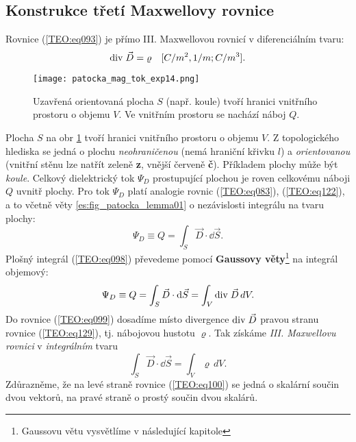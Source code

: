     \subsection{Konstrukce třetí Maxwellovy rovnice}\label{ES:ssec02}
      Rovnice (\ref{TEO:eq093}) je přímo III. Maxwellovou rovnicí v diferenciálním tvaru:
      \begin{equation}\label{TEO:eq129}
        \mathrm{div}\;\vec{D} = \varrho \quad [C/m^2, 1/m; C/m^3]. 
      \end{equation} 
      \begin{figure}[ht!]
        \centering
        \texttt{[image: patocka\_mag\_tok\_exp14.png]}
        \caption{Uzavřená orientovaná plocha \(S\) (např. koule) tvoří hranici vnitřního prostoru o 
                 objemu \(V\). Ve vnitřním prostoru se nachází náboj \(Q\).}
        \label{es:fig_patocka_mag_tok_exp14}
      \end{figure}
      
      Plocha \(S\) na obr \ref{es:fig_patocka_mag_tok_exp14} tvoří hranici vnitřního prostoru o 
      objemu \(V\). Z topologického hlediska se jedná o plochu \emph{neohraničenou} (nemá hraniční 
      křivku \(l\)) a \emph{orientovanou} (vnitřní stěnu lze natřít zeleně \textbf{z}, vnější 
      červeně \textbf{č}). Příkladem plochy může být \emph{koule}. Celkový dielektrický tok 
      \(\Psi_D\) prostupující plochou je roven celkovému náboji \(Q\) uvnitř plochy. Pro tok 
      \(\Psi_D\) platí analogie rovnic (\ref{TEO:eq083}), (\ref{TEO:eq122}), a to 
      včetně věty \ref{es:fig_patocka_lemma01} o nezávislosti integrálu na tvaru plochy:
      \begin{equation}\label{TEO:eq098}
        \Psi_D \equiv Q = \int_S\vec{D}\cdot \dd{\vec{S}}.
      \end{equation} 
      Plošný integrál (\ref{TEO:eq098}) převedeme pomocí \textbf{Gaussovy 
      věty}\footnote{Gaussovu větu vysvětlíme v následující kapitole} na integrál objemový:
      \begin{equation}\label{TEO:eq099}
        \Psi_D \equiv Q = \int_S\vec{D}\cdot \mathop{}\!\mathrm{d}\vec{S} = \int_V\mathrm{div}\;\vec{D}\,dV.
      \end{equation} 
      Do rovnice (\ref{TEO:eq099}) dosadíme místo divergence \(\mathrm{div}\;\vec{D}\) pravou stranu 
      rovnice (\ref{TEO:eq129}), tj. nábojovou hustotu \(\varrho\). Tak získáme \emph{III. 
      Maxwellovu rovnici} v \emph{integrálním} tvaru
      \begin{equation}\label{TEO:eq100}
        \boxed{\int_S\vec{D}\cdot \dd{\vec{S}} = \int_V\varrho\,dV}.
      \end{equation} 
      Zdůrazněme, že na levé straně rovnice (\ref{TEO:eq100}) se jedná o skalární součin 
      dvou vektorů, na pravé straně o prostý součin dvou skalárů.
      
